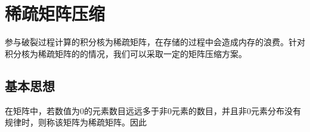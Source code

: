         \appendix
\chapter{稀疏矩阵压缩}

\indent 参与破裂过程计算的积分核为稀疏矩阵，在存储的过程中会造成内存的浪费。针对积分核为稀疏矩阵的的情况，我们可以采取一定的矩阵压缩方案。

\section{基本思想}
\indent 在矩阵中，若数值为0的元素数目远远多于非0元素的数目，并且非0元素分布没有规律时，则称该矩阵为稀疏矩阵。因此
